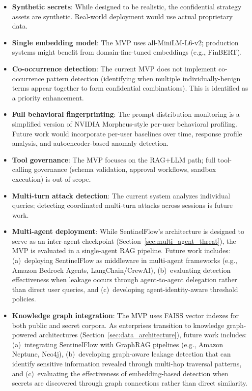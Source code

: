 \documentclass[12pt,a4paper]{article}
\begin{document}
\begin{itemize}[leftmargin=*]
    \item \textbf{Synthetic secrets}: While designed to be realistic, the confidential strategy assets are synthetic. Real-world deployment would use actual proprietary data.
    \item \textbf{Single embedding model}: The MVP uses all-MiniLM-L6-v2; production systems might benefit from domain-fine-tuned embeddings (e.g., FinBERT).
    \item \textbf{Co-occurrence detection}: The current MVP does not implement co-occurrence pattern detection (identifying when multiple individually-benign terms appear together to form confidential combinations). This is identified as a priority enhancement.
    \item \textbf{Full behavioral fingerprinting}: The prompt distribution monitoring is a simplified version of NVIDIA Morpheus-style per-user behavioral profiling. Future work would incorporate per-user baselines over time, response profile analysis, and autoencoder-based anomaly detection.
    \item \textbf{Tool governance}: The MVP focuses on the RAG+LLM path; full tool-calling governance (schema validation, approval workflows, sandbox execution) is out of scope.
    \item \textbf{Multi-turn attack detection}: The current system analyzes individual queries; detecting coordinated multi-turn attacks across sessions is future work.
    \item \textbf{Multi-agent deployment}: While SentinelFlow's architecture is designed to serve as an inter-agent checkpoint (Section~\ref{sec:multi_agent_threat}), the MVP is evaluated in a single-agent RAG pipeline. Future work includes: (a)~deploying SentinelFlow as middleware in multi-agent frameworks (e.g., Amazon Bedrock Agents, LangChain/CrewAI), (b)~evaluating detection effectiveness when leakage occurs through agent-to-agent delegation rather than direct user queries, and (c)~developing agent-identity-aware threshold policies.
    \item \textbf{Knowledge graph integration}: The MVP uses FAISS vector indexes for both public and secret corpora. As enterprises transition to knowledge graph-powered architectures (Section~\ref{sec:data_architecture}), future work includes: (a)~integrating SentinelFlow with GraphRAG pipelines (e.g., Amazon Neptune, Neo4j), (b)~developing graph-aware leakage detection that can identify sensitive information revealed through multi-hop traversal patterns, and (c)~evaluating the effectiveness of embedding-based detection when secrets are discovered through graph connections rather than direct similarity.

\end{itemize}
\end{document}

